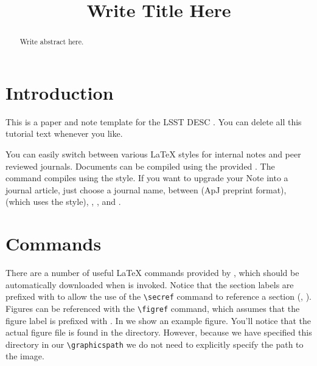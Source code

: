 \documentclass[\docopts]{\docclass}
\begin{document}
\title{Write Title Here}

\maketitlepre

\begin{abstract}

  Write abstract here.

\end{abstract}


\maketitlepost


\section{Introduction}
\label{sec:intro}

This is a paper and note template for the LSST DESC \citep{Overview,ScienceBook,WhitePaper}.
You can delete all this tutorial text whenever you like.

You can easily switch between various \LaTeX\xspace styles for internal notes and peer reviewed journals.
Documents can be compiled using the provided .
The command  compiles  using the   style.
If you want to upgrade your Note into a journal article, just choose a journal name, between  (ApJ preprint format),  (which uses the  style), , , and .



\section{Commands}
\label{sec:commands}

There are a number of useful \LaTeX\xspace commands provided by , which should be automatically downloaded when  is invoked.
Notice that the section labels are prefixed with  to allow the use of the \verb=\secref= command to reference a section (\ie, ).
Figures can be referenced with the \verb=\figref= command, which assumes that the figure label is prefixed with .
In  we show an example figure.
You'll notice that the actual figure file is found in the  directory.
However, because we have specified this directory in our \verb=\graphicspath= we do not need to explicitly specify the path to the image.
\end{document}
